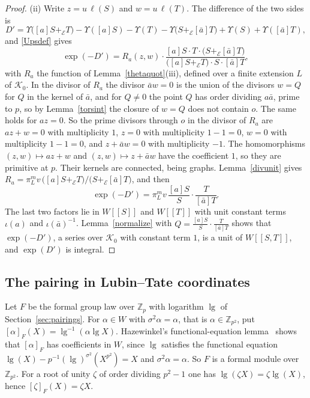 \begin{proof}
(ii) Write $z=u\,\ell(S)$ and $w=u\,\ell(T)$. The difference of the two sides is
\[
D'=\Upsilon\big([a]S+_{\mathcal E}T\big)-\Upsilon([a]S)-\Upsilon(T)-\Upsilon\big(S+_{\mathcal E}[\bar a]T\big)+\Upsilon(S)+\Upsilon([\bar a]T),
\]
and \eqref{Upsdef} gives
\[
\exp(-D')=R_a(z,w)\cdot\frac{[a]S\cdot T\cdot\big(S+_{\mathcal E}[\bar a]T\big)}{\big([a]S+_{\mathcal E}T\big)\cdot S\cdot[\bar a]T},
\]
with $R_a$ the function of Lemma~\ref{thetaquot}(iii), defined over a finite extension $L$ of $\mathcal K_0$. In the divisor of $R_a$ the divisor $\bar aw=0$ is the union of the divisors $w=Q$ for $Q$ in the kernel of $\bar a$, and for $Q\ne0$ the point $Q$ has order dividing $a\bar a$, prime to $p$, so by Lemma~\ref{torsint} the closure of $w=Q$ does not contain $o$. The same holds for $az=0$. So the prime divisors through $o$ in the divisor of $R_a$ are $az+w=0$ with multiplicity $1$, $z=0$ with multiplicity $1-1=0$, $w=0$ with multiplicity $1-1=0$, and $z+\bar aw=0$ with multiplicity $-1$. The homomorphisms $(z,w)\mapsto az+w$ and $(z,w)\mapsto z+\bar aw$ have the coefficient $1$, so they are primitive at $p$. Their kernels are connected, being graphs. Lemma~\ref{divunit} gives $R_a=\pi_L^mv\,\big([a]S+_{\mathcal E}T\big)/\big(S+_{\mathcal E}[\bar a]T\big)$, and then
\[
\exp(-D')=\pi_L^mv\,\frac{[a]S}{S}\cdot\frac T{[\bar a]T}.
\]
The last two factors lie in $W[[S]]$ and $W[[T]]$ with unit constant terms $\iota(a)$ and $\iota(\bar a)^{-1}$. Lemma~\ref{normalize} with $Q=\frac{[a]S}S\cdot\frac T{[\bar a]T}$ shows that $\exp(-D')$, a series over $\mathcal K_0$ with constant term $1$, is a unit of $W[[S,T]]$, and $\exp(D')$ is integral.
\end{proof}

\subsection{The pairing in Lubin--Tate coordinates}\label{sec:ltpairing}

Let $F$ be the formal group law over $\mathbb Z_p$ with logarithm $\operatorname{lg}$ of Section~\ref{sec:pairings}. For $\alpha\in W$ with $\sigma^2\alpha=\alpha$, that is $\alpha\in\mathbb Z_{p^2}$, put $[\alpha]_F(X)=\operatorname{lg}^{-1}(\alpha\operatorname{lg}X)$. Hazewinkel's functional-equation lemma~\cite[Section~2.2]{hazewinkel} shows that $[\alpha]_F$ has coefficients in $W$, since $\operatorname{lg}$ satisfies the functional equation $\operatorname{lg}(X)-p^{-1}(\operatorname{lg})^{\sigma^2}(X^{p^2})=X$ and $\sigma^2\alpha=\alpha$. So $F$ is a formal module over $\mathbb Z_{p^2}$. For a root of unity $\zeta$ of order dividing $p^2-1$ one has $\operatorname{lg}(\zeta X)=\zeta\operatorname{lg}(X)$, hence $[\zeta]_F(X)=\zeta X$.


